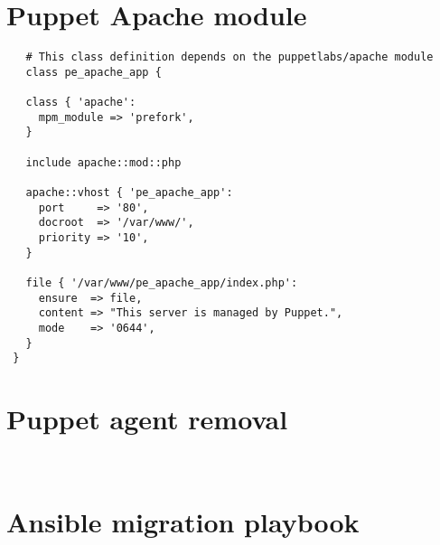 \begin{appendices}
  \renewcommand\thetable{\thesection\arabic{table}}
  \renewcommand\thefigure{\thesection\arabic{figure}}

  \section{Puppet Apache module} \label{app:puppetmodule}
  \begin{lstlisting}
   # This class definition depends on the puppetlabs/apache module
   class pe_apache_app {

   class { 'apache':
     mpm_module => 'prefork',
   }

   include apache::mod::php

   apache::vhost { 'pe_apache_app':
     port     => '80',
     docroot  => '/var/www/',
     priority => '10',
   }

   file { '/var/www/pe_apache_app/index.php':
     ensure  => file,
     content => "This server is managed by Puppet.",
     mode    => '0644',
   }
 }
  \end{lstlisting}
  \newpage

  \section{Puppet agent removal} \label{app:puppetagent}
  \begin{lstlisting}
  
  \end{lstlisting}

  \section{Ansible migration playbook} \label{app:ansibleplaybook}
  \begin{lstlisting}
	
  \end{lstlisting}

\end{appendices}


